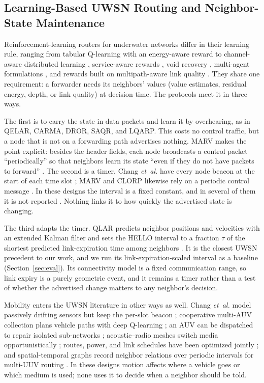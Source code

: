 \subsection{Learning-Based UWSN Routing and Neighbor-State Maintenance}
Reinforcement-learning routers for underwater networks differ in their
learning rule, ranging from tabular Q-learning with an energy-aware
reward \cite{hu2010qelar} to channel-aware distributed learning
\cite{divalerio2019carma}, service-aware rewards \cite{zhang2025saqr},
void recovery \cite{wang2023rldepth}, multi-agent formulations
\cite{wang2024marv,liu2024clorP}, and rewards built on multipath-aware
link quality \cite{liu2026lqarp}.
They share one requirement: a forwarder needs its neighbors' values
(value estimates, residual energy, depth, or link quality) at decision
time.
The protocols meet it in three ways.

The first is to carry the state in data packets and learn it by
overhearing, as in QELAR, CARMA, DROR, SAQR, and LQARP.
This costs no control traffic, but a node that is not on a forwarding
path advertises nothing.
MARV makes the point explicit: besides the header fields, each node
broadcasts a control packet ``periodically'' so that neighbors learn its
state ``even if they do not have packets to forward''
\cite{wang2024marv}.
The second is a timer.
Chang \emph{et~al.} have every node beacon at the start of each time
slot \cite{chang2019passive}; MARV and CLORP likewise rely on a
periodic control message \cite{wang2024marv,liu2024clorP}.
In these designs the interval is a fixed constant, and in several of
them it is not reported
\cite{chang2019passive,wang2024marv,liu2024clorP}.
Nothing links it to how quickly the advertised state is changing.

The third adapts the timer.
QLAR predicts neighbor positions and velocities with an extended Kalman
filter and sets the HELLO interval to a fraction $\tau$ of the shortest
predicted link-expiration time among neighbors \cite{li2025qlar}.
It is the closest UWSN precedent to our work, and we run its
link-expiration-scaled interval as a baseline (Section~\ref{sec:eval}).
Its connectivity model is a fixed communication range, so link expiry
is a purely geometric event, and it remains a timer rather than a test
of whether the advertised change matters to any neighbor's decision.

Mobility enters the UWSN literature in other ways as well.
Chang \emph{et~al.} model passively drifting sensors but keep the
per-slot beacon \cite{chang2019passive}; cooperative multi-AUV
collection plans vehicle paths with deep Q-learning
\cite{wang2024lgdqn,liu2025mdqn,lu2025wper}; an AUV can be dispatched
to repair isolated sub-networks \cite{nandyala2025isolated};
acoustic--radio meshes switch media opportunistically
\cite{jiang2023hybrid}; routes, power, and link schedules have been
optimized jointly \cite{yuan2024multiobj,yuan2024crosslayer}; and
spatial-temporal graphs record neighbor relations over periodic
intervals for multi-UUV routing \cite{xu2025stgr}.
In these designs motion affects where a vehicle goes or which medium is
used; none uses it to decide when a neighbor should be told.

